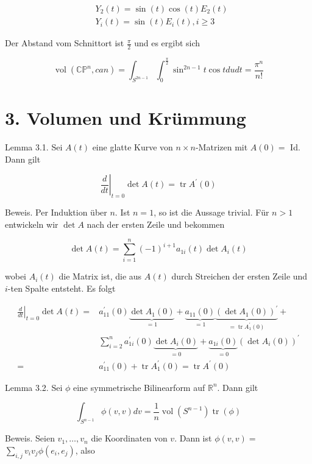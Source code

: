 \documentclass[10pt, letterpaper]{article}
\begin{document}
$$
\begin{aligned}
& Y_{2}(t)=\sin (t) \cos (t) E_{2}(t) \\
& Y_{i}(t)=\sin (t) E_{i}(t), i \geq 3
\end{aligned}
$$

Der Abstand vom Schnittort ist $\frac{\pi}{2}$ und es ergibt sich

$$
\operatorname{vol}\left(\mathbb{C P}^{n}, c a n\right)=\int_{S^{2 n-1}} \int_{0}^{\frac{\pi}{2}} \sin ^{2 n-1} t \cos t d u d t=\frac{\pi^{n}}{n!}
$$

\section*{3. Volumen und Krümmung}
Lemma 3.1. Sei $A(t)$ eine glatte Kurve von $n \times n$-Matrizen mit $A(0)=$ Id. Dann gilt

$$
\left.\frac{d}{d t}\right|_{t=0} \operatorname{det} A(t)=\operatorname{tr} A^{\prime}(0)
$$

Beweis. Per Induktion über $n$. Ist $n=1$, so ist die Aussage trivial. Für $n>1$ entwickeln wir $\operatorname{det} A$ nach der ersten Zeile und bekommen

$$
\operatorname{det} A(t)=\sum_{i=1}^{n}(-1)^{i+1} a_{1 i}(t) \operatorname{det} A_{i}(t)
$$

wobei $A_{i}(t)$ die Matrix ist, die aus $A(t)$ durch Streichen der ersten Zeile und $i$-ten Spalte entsteht. Es folgt

$$
\begin{aligned}
\left.\frac{d}{d t}\right|_{t=0} \operatorname{det} A(t)= & a_{11}^{\prime}(0) \underbrace{\operatorname{det} A_{1}(0)}_{=1}+\underbrace{a_{11}(0)}_{=1} \underbrace{\left(\operatorname{det} A_{1}(0)\right)^{\prime}}_{=\operatorname{tr} A_{1}^{\prime}(0)}+ \\
& \sum_{i=2}^{n} a_{1 i}^{\prime}(0) \underbrace{\operatorname{det} A_{i}(0)}_{=0}+\underbrace{a_{1 i}(0)}_{=0}\left(\operatorname{det} A_{i}(0)\right)^{\prime} \\
= & a_{11}^{\prime}(0)+\operatorname{tr} A_{1}^{\prime}(0)=\operatorname{tr} A^{\prime}(0)
\end{aligned}
$$

Lemma 3.2. Sei $\phi$ eine symmetrische Bilinearform auf $\mathbb{R}^{n}$. Dann gilt

$$
\int_{S^{n-1}} \phi(v, v) d v=\frac{1}{n} \operatorname{vol}\left(S^{n-1}\right) \operatorname{tr}(\phi)
$$

Beweis. Seien $v_{1}, \ldots, v_{n}$ die Koordinaten von $v$. Dann ist $\phi(v, v)=$ $\sum_{i, j} v_{i} v_{j} \phi\left(e_{i}, e_{j}\right)$, also
\end{document}
